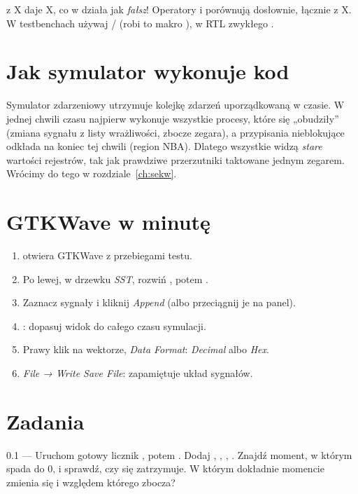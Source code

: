 \begin{pulapka}[Porównania z X]
 z X daje X, co w  działa jak \emph{fałsz}! Operatory
\code{===} i \code{!==} porównują dosłownie, łącznie z X. W testbenchach
używaj \code{===}/\code{!==} (robi to makro ), w RTL zwykłego
\code{==}.
\end{pulapka}

\section{Jak symulator wykonuje kod}

Symulator zdarzeniowy utrzymuje kolejkę zdarzeń uporządkowaną w czasie. W
jednej chwili czasu najpierw wykonuje wszystkie procesy, które się
„obudziły” (zmiana sygnału z listy wrażliwości, zbocze zegara), a przypisania
nieblokujące \code{<=} odkłada na koniec tej chwili (region NBA). Dlatego
wszystkie  widzą \emph{stare} wartości rejestrów, tak jak
prawdziwe przerzutniki taktowane jednym zegarem. Wrócimy do tego w
rozdziale~\ref{ch:sekw}.

\section{GTKWave w minutę}

\begin{enumerate}
  \item {} otwiera GTKWave z przebiegami testu.
  \item Po lewej, w drzewku \emph{SST}, rozwiń , potem .
  \item Zaznacz sygnały i kliknij \emph{Append} (albo przeciągnij je na panel).
  \item {}: dopasuj widok do całego czasu symulacji.
  \item Prawy klik na wektorze, \emph{Data Format}: \emph{Decimal} albo \emph{Hex}.
  \item \emph{File → Write Save File}: zapamiętuje układ sygnałów.
\end{enumerate}

\section{Zadania}

\begin{zadanie}{0.1 --- Uruchom gotowy licznik}
, potem . Dodaj
, , , . Znajdź moment, w którym 
spada do 0, i sprawdź, czy  się zatrzymuje. W którym dokładnie
momencie zmienia się  i względem którego zbocza?
\end{zadanie}

